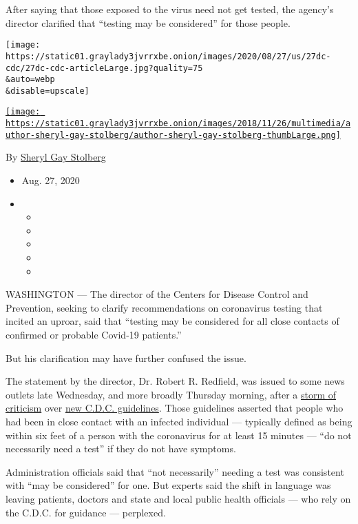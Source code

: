 After saying that those exposed to the virus need not get tested, the
agency's director clarified that ``testing may be considered'' for those
people.

\texttt{[image: https://static01.graylady3jvrrxbe.onion/images/2020/08/27/us/27dc-cdc/27dc-cdc-articleLarge.jpg?quality=75\\\&auto=webp\\\&disable=upscale]}

\href{https://www.nytimes3xbfgragh.onion/by/sheryl-gay-stolberg}{\texttt{[image: https://static01.graylady3jvrrxbe.onion/images/2018/11/26/multimedia/author-sheryl-gay-stolberg/author-sheryl-gay-stolberg-thumbLarge.png]}}

By
\href{https://www.nytimes3xbfgragh.onion/by/sheryl-gay-stolberg}{Sheryl
Gay Stolberg}

\begin{itemize}
\item
  Aug. 27, 2020
\item
  \begin{itemize}
  \item
  \item
  \item
  \item
  \item
  \end{itemize}
\end{itemize}

WASHINGTON --- The director of the Centers for Disease Control and
Prevention, seeking to clarify recommendations on coronavirus testing
that incited an uproar, said that ``testing may be considered for all
close contacts of confirmed or probable Covid-19 patients.''

But his clarification may have further confused the issue.

The statement by the director, Dr. Robert R. Redfield, was issued to
some news outlets late Wednesday, and more broadly Thursday morning,
after a
\href{https://www.nytimes3xbfgragh.onion/2020/08/26/us/politics/coronavirus-testing-trump-cdc.html}{storm
of criticism} over
\href{https://www.nytimes3xbfgragh.onion/2020/08/25/health/covid-19-testing-cdc.html}{new
C.D.C. guidelines}. Those guidelines asserted that people who had been
in close contact with an infected individual --- typically defined as
being within six feet of a person with the coronavirus for at least 15
minutes --- ``do not necessarily need a test'' if they do not have
symptoms.

Administration officials said that ``not necessarily'' needing a test
was consistent with ``may be considered'' for one. But experts said the
shift in language was leaving patients, doctors and state and local
public health officials --- who rely on the C.D.C. for guidance ---
perplexed.

